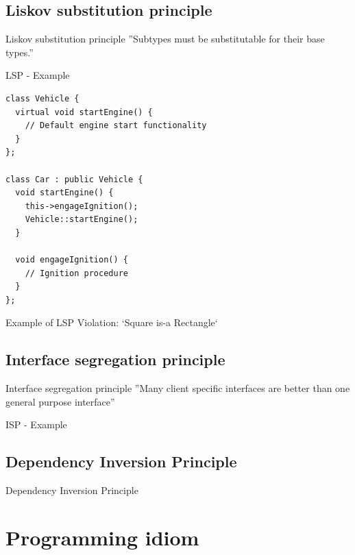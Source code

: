 \documentclass{beamer}
\begin{document}
\subsection{Liskov substitution principle}

\begin{frame}{Liskov substitution principle}
''Subtypes must be substitutable for their base types.''
\end{frame}

\begin{frame}[fragile]{LSP - Example}
\begin{lstlisting}[caption=LSP Example]
class Vehicle {
  virtual void startEngine() {
    // Default engine start functionality
  }
};

class Car : public Vehicle {
  void startEngine() {
    this->engageIgnition();
    Vehicle::startEngine();
  }

  void engageIgnition() {
    // Ignition procedure
  }
};
\end{lstlisting}
Example of LSP Violation: `Square is-a Rectangle`
\end{frame}


\subsection{Interface segregation principle}

\begin{frame}{Interface segregation principle}
''Many client specific interfaces are better than one general purpose
interface''
\end{frame}

\begin{frame}{ISP - Example}
\end{frame}


\subsection{Dependency Inversion Principle}

\begin{frame}{Dependency Inversion Principle}
\end{frame}

\section{Programming idiom}

\end{document}
